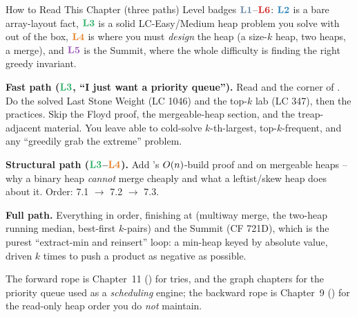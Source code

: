 \begin{chaptertheorybox}{How to Read This Chapter (three paths)}
Level badges $\lv1$--$\lv6$: $\lv2$ is a bare array-layout fact, $\lv3$ is a solid LC-Easy/Medium heap
problem you solve with  out of the box, $\lv4$ is where you must \emph{design} the
heap (a size-$k$ heap, two heaps, a merge), and $\lv5$ is the Summit, where the whole difficulty is
finding the right greedy invariant.

\textbf{Fast path ($\lv3$, ``I just want a priority queue'').} Read  and the
 corner of . Do the solved Last Stone Weight (LC 1046) and
the top-$k$ lab (LC 347), then the practices. Skip the Floyd proof, the mergeable-heap section, and the
treap-adjacent material. You leave able to cold-solve $k$-th-largest, top-$k$-frequent, and any
``greedily grab the extreme'' problem.

\textbf{Structural path ($\lv3$--$\lv4$).} Add 's $O(n)$-build proof and
 on mergeable heaps -- why a binary heap \emph{cannot} merge cheaply and what a
leftist/skew heap does about it. Order: 7.1 $\to$ 7.2 $\to$ 7.3.

\textbf{Full path.} Everything in order, finishing at  (multiway merge, the two-heap
running median, best-first $k$-pairs) and the Summit (CF 721D), which is the purest ``extract-min and
reinsert'' loop: a min-heap keyed by absolute value, driven $k$ times to push a product as negative as
possible.

The forward rope is Chapter~11 () for tries, and the graph chapters for the priority queue used
as a \emph{scheduling} engine; the backward rope is Chapter~9 () for the read-only heap order
you do \emph{not} maintain.
\end{chaptertheorybox}

